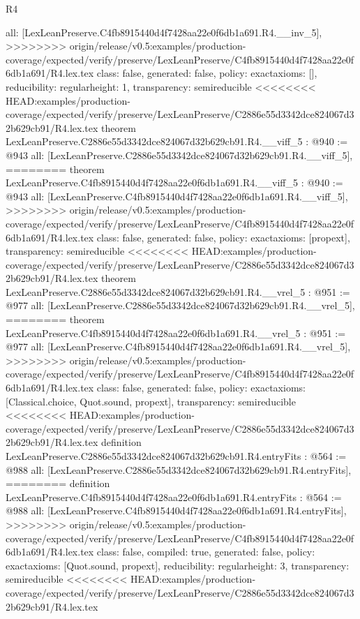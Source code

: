 \begin{lexlean}{R4}
\begin{coremodule}
{{{{{{{{{{{{  all: [LexLeanPreserve.C4fb8915440d4f7428aa22e0f6db1a691.R4.__inv_5],
>>>>>>>> origin/release/v0.5:examples/production-coverage/expected/verify/preserve/LexLeanPreserve/C4fb8915440d4f7428aa22e0f6db1a691/R4.lex.tex
  class: false,
  generated: false,
  policy: exact{axioms: []},
  reducibility: regular{height: 1},
  transparency: semireducible
}
<<<<<<<< HEAD:examples/production-coverage/expected/verify/preserve/LexLeanPreserve/C2886e55d3342dce824067d32b629cb91/R4.lex.tex
theorem LexLeanPreserve.C2886e55d3342dce824067d32b629cb91.R4.__viff_5 : @940 := @943 {
  all: [LexLeanPreserve.C2886e55d3342dce824067d32b629cb91.R4.__viff_5],
========
theorem LexLeanPreserve.C4fb8915440d4f7428aa22e0f6db1a691.R4.__viff_5 : @940 := @943 {
  all: [LexLeanPreserve.C4fb8915440d4f7428aa22e0f6db1a691.R4.__viff_5],
>>>>>>>> origin/release/v0.5:examples/production-coverage/expected/verify/preserve/LexLeanPreserve/C4fb8915440d4f7428aa22e0f6db1a691/R4.lex.tex
  class: false,
  generated: false,
  policy: exact{axioms: [propext]},
  transparency: semireducible
}
<<<<<<<< HEAD:examples/production-coverage/expected/verify/preserve/LexLeanPreserve/C2886e55d3342dce824067d32b629cb91/R4.lex.tex
theorem LexLeanPreserve.C2886e55d3342dce824067d32b629cb91.R4.__vrel_5 : @951 := @977 {
  all: [LexLeanPreserve.C2886e55d3342dce824067d32b629cb91.R4.__vrel_5],
========
theorem LexLeanPreserve.C4fb8915440d4f7428aa22e0f6db1a691.R4.__vrel_5 : @951 := @977 {
  all: [LexLeanPreserve.C4fb8915440d4f7428aa22e0f6db1a691.R4.__vrel_5],
>>>>>>>> origin/release/v0.5:examples/production-coverage/expected/verify/preserve/LexLeanPreserve/C4fb8915440d4f7428aa22e0f6db1a691/R4.lex.tex
  class: false,
  generated: false,
  policy: exact{axioms: [Classical.choice, Quot.sound, propext]},
  transparency: semireducible
}
<<<<<<<< HEAD:examples/production-coverage/expected/verify/preserve/LexLeanPreserve/C2886e55d3342dce824067d32b629cb91/R4.lex.tex
definition LexLeanPreserve.C2886e55d3342dce824067d32b629cb91.R4.entryFits : @564 := @988 {
  all: [LexLeanPreserve.C2886e55d3342dce824067d32b629cb91.R4.entryFits],
========
definition LexLeanPreserve.C4fb8915440d4f7428aa22e0f6db1a691.R4.entryFits : @564 := @988 {
  all: [LexLeanPreserve.C4fb8915440d4f7428aa22e0f6db1a691.R4.entryFits],
>>>>>>>> origin/release/v0.5:examples/production-coverage/expected/verify/preserve/LexLeanPreserve/C4fb8915440d4f7428aa22e0f6db1a691/R4.lex.tex
  class: false,
  compiled: true,
  generated: false,
  policy: exact{axioms: [Quot.sound, propext]},
  reducibility: regular{height: 3},
  transparency: semireducible
}
<<<<<<<< HEAD:examples/production-coverage/expected/verify/preserve/LexLeanPreserve/C2886e55d3342dce824067d32b629cb91/R4.lex.tex
}}}}}}}}}}}}}}
\end{coremodule}
\end{lexlean}
